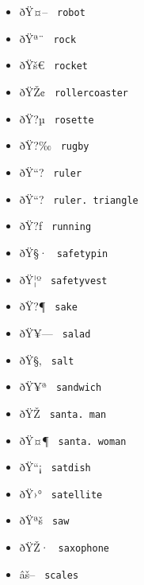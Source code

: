 \begin{itemize}
\item
  \label{symbol-robot}{{ ðŸ¤-- } \texttt{\ robot\ }}
\item
  \label{symbol-rock}{{ ðŸª¨ } \texttt{\ rock\ }}
\item
  \label{symbol-rocket}{{ ðŸš€ } \texttt{\ rocket\ }}
\item
  \label{symbol-rollercoaster}{{ ðŸŽ¢ }
  \texttt{\ rollercoaster\ }}
\item
  \label{symbol-rosette}{{ ðŸ?µ } \texttt{\ rosette\ }}
\item
  \label{symbol-rugby}{{ ðŸ?‰ } \texttt{\ rugby\ }}
\item
  \label{symbol-ruler}{{ ðŸ``? } \texttt{\ ruler\ }}
\item
  \label{symbol-ruler.triangle}{{ ðŸ``? }
  \texttt{\ ruler.\ triangle\ }}
\item
  \label{symbol-running}{{ ðŸ?ƒ } \texttt{\ running\ }}
\item
  \label{symbol-safetypin}{{ ðŸ§· }
  \texttt{\ safetypin\ }}
\item
  \label{symbol-safetyvest}{{ ðŸ¦º }
  \texttt{\ safetyvest\ }}
\item
  \label{symbol-sake}{{ ðŸ?¶ } \texttt{\ sake\ }}
\item
  \label{symbol-salad}{{ ðŸ¥--- } \texttt{\ salad\ }}
\item
  \label{symbol-salt}{{ ðŸ§‚ } \texttt{\ salt\ }}
\item
  \label{symbol-sandwich}{{ ðŸ¥ª } \texttt{\ sandwich\ }}
\item
  \label{symbol-santa.man}{{ ðŸŽ }
  \texttt{\ santa.\ man\ }}
\item
  \label{symbol-santa.woman}{{ ðŸ¤¶ }
  \texttt{\ santa.\ woman\ }}
\item
  \label{symbol-satdish}{{ ðŸ``¡ } \texttt{\ satdish\ }}
\item
  \label{symbol-satellite}{{ ðŸ›° }
  \texttt{\ satellite\ }}
\item
  \label{symbol-saw}{{ ðŸªš } \texttt{\ saw\ }}
\item
  \label{symbol-saxophone}{{ ðŸŽ· }
  \texttt{\ saxophone\ }}
\item
  \label{symbol-scales}{{ âš-- } \texttt{\ scales\ }}

\end{itemize}
